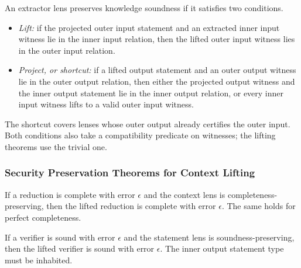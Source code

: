 \begin{definition}
    \label{def:context_lens_is_knowledge_sound}
    An extractor lens preserves knowledge soundness if it satisfies two conditions.
    \begin{itemize}
        \item \emph{Lift:} if the projected outer input statement and an extracted inner input
        witness lie in the inner input relation, then the lifted outer input witness lies in the
        outer input relation.
        \item \emph{Project, or shortcut:} if a lifted output statement and an outer output witness
        lie in the outer output relation, then either the projected output witness and the inner
        output statement lie in the inner output relation, or every inner input witness lifts to a
        valid outer input witness.
    \end{itemize}
    The shortcut covers lenses whose outer output already certifies the outer input. Both
    conditions also take a compatibility predicate on witnesses; the lifting theorems use the
    trivial one.
    \leanok
\end{definition}

\subsubsection{Security Preservation Theorems for Context Lifting}

\begin{theorem}
    \label{thm:lift_context_completeness}
    If a reduction is complete with error $\epsilon$ and the context lens is
    completeness-preserving, then the lifted reduction is complete with error $\epsilon$. The same
    holds for perfect completeness.
    \leanok
\end{theorem}

\begin{theorem}
    \label{thm:lift_context_soundness}
    If a verifier is sound with error $\epsilon$ and the statement lens is soundness-preserving,
    then the lifted verifier is sound with error $\epsilon$. The inner output statement type must
    be inhabited.
    \leanok
\end{theorem}

